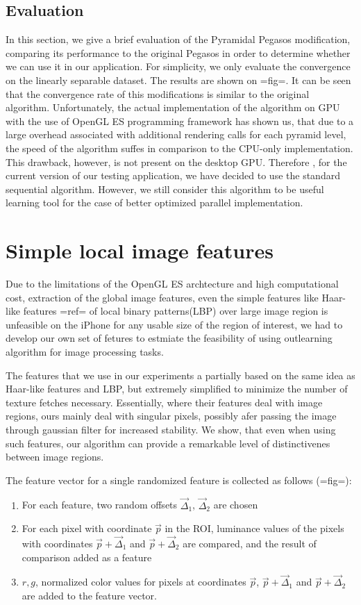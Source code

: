 \subsection{Evaluation}
In this section, we give a brief evaluation of the Pyramidal Pegasos modification, comparing its performance to the original Pegasos in order to determine whether we can use it in our application. For simplicity, we only evaluate the convergence on the linearly separable dataset. The results are shown on {{=fig=}}. It can be seen that the convergence rate of this modifications is similar to the original algorithm. Unfortunately, the actual implementation of the algorithm on GPU with the use of OpenGL ES programming framework has shown us, that due to a large overhead associated with additional rendering calls for each pyramid level, the speed of the algorithm suffes in comparison to the CPU-only implementation. This drawback, however, is not present on the desktop GPU. Therefore , for the current version of our testing application, we have decided to use the standard sequential algorithm. However, we still consider this algorithm to be useful learning tool for the case of better optimized parallel implementation. 
\section{Simple local image features}

Due to the limitations of the OpenGL ES archtecture and high computational cost, extraction of the global image features, even the simple features like Haar-like features {{=ref=}} of local binary patterns(LBP) over large image region is unfeasible on the iPhone for any usable size of the region of interest, we had to develop our own set of fetures to estmiate the feasibility of using outlearning algorithm for image processing tasks.

The features that we use in our experiments a partially based on the same idea as Haar-like features and LBP, but extremely simplified to minimize the number of texture  fetches necessary. Essentially, where their features deal with image regions, ours mainly deal with singular pixels, possibly afer passing the image through gaussian filter for increased stability. We show, that even when using such features, our algorithm can provide a remarkable level of distinctivenes between image regions.

The feature vector for a single randomized feature is collected as follows ({{=fig=}}):
\begin{enumerate}
\item For each feature, two random offsets $\vec{\Delta}_1$, $\vec{\Delta}_2$ are chosen
\item For each pixel with coordinate $\vec{p}$ in the ROI, luminance values of the pixels with coordinates $\vec{p}+\vec{\Delta}_1$ and $\vec{p}+\vec{\Delta}_2 $ are compared, and the result of comparison added as a feature
\item $r,g$, normalized color values for pixels at coordinates $\vec{p}$, $\vec{p}+\vec{\Delta}_1$ and $\vec{p}+\vec{\Delta}_2 $ are added to the feature vector.
\end{enumerate} 

